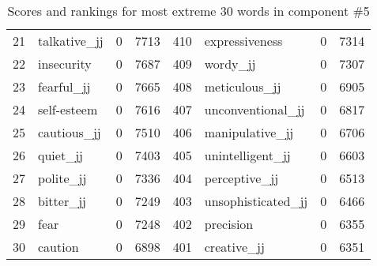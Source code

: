 \begin{table}[tbp]
\begin{tabular}{| rlr@{.}l | rlr@{.}l |}
    21 & talkative\_jj & 0 & 7713    &    410 & expressiveness & 0 & 7314 \\
    22 & insecurity & 0 & 7687    &    409 & wordy\_jj & 0 & 7307 \\
    23 & fearful\_jj & 0 & 7665    &    408 & meticulous\_jj & 0 & 6905 \\
    24 & self-esteem & 0 & 7616    &    407 & unconventional\_jj & 0 & 6817 \\
    25 & cautious\_jj & 0 & 7510    &    406 & manipulative\_jj & 0 & 6706 \\
    26 & quiet\_jj & 0 & 7403    &    405 & unintelligent\_jj & 0 & 6603 \\
    27 & polite\_jj & 0 & 7336    &    404 & perceptive\_jj & 0 & 6513 \\
    28 & bitter\_jj & 0 & 7249    &    403 & unsophisticated\_jj & 0 & 6466 \\
    29 & fear & 0 & 7248    &    402 & precision & 0 & 6355 \\
    30 & caution & 0 & 6898    &    401 & creative\_jj & 0 & 6351 \\
    \hline
    \end{tabular}
    \caption{Scores and rankings for most extreme 30 words in component \#5} 
\end{table}
\clearpage
